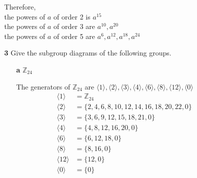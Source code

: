 \documentclass[paper=usletter, fontsize=12pt]{article}
\begin{document}
\begin{itemize}
\begin{itemize}
\begin{cproof}
                Therefore,\\
                the powers of $a$ of order 2 is $a^{15}$\\
                the powers of $a$ of order 3 are $a^{10},a^{20}$\\
                the powers of $a$ of order 5 are $a^{6},a^{12},a^{18},a^{24}$ \qedhere

            \end{cproof}

            \item[\textbf{3}] Give the subgroup diagrams of the following
            groups.
            \begin{enumerate}

                \item[\textbf{a}] $\mathbb{Z}_{24}$
                \begin{cproof}

                    The generators of $\mathbb{Z}_{24}$ are $\langle1\rangle,
                    \langle2\rangle, \langle3\rangle, \langle4\rangle,
                    \langle6\rangle, \langle8\rangle,
                    \langle12\rangle, \langle0\rangle$
                    \begin{align*}
                        \langle1\rangle & = \mathbb{Z}_{24}\\
                        \langle2\rangle & = \{2,4,6,8,10,12,14,16,18,20,22,0\}\\
                        \langle3\rangle & = \{3,6,9,12,15,18,21,0\}\\
                        \langle4\rangle & = \{4,8,12,16,20,0\}\\
                        \langle6\rangle & = \{6,12,18,0\}\\
                        \langle8\rangle & = \{8,16,0\}\\
                        \langle12\rangle & = \{12,0\}\\
                        \langle0\rangle & = \{0\}
                    \end{align*}


\end{cproof}
\end{enumerate}
\end{itemize}
\end{itemize}
\end{document}
